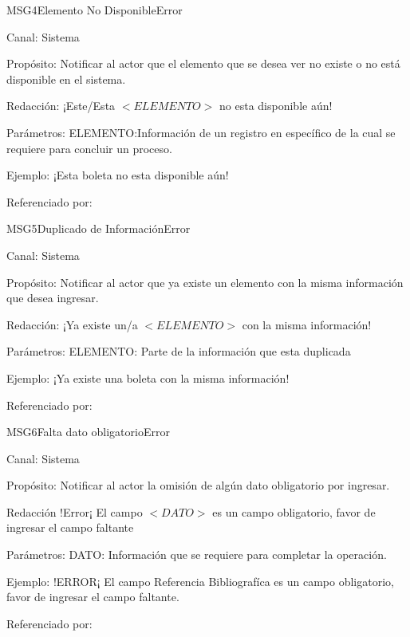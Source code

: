 \begin{mensaje}{MSG4}{Elemento No Disponible}{Error}
	\item[Canal:] Sistema
	\item[Propósito:] Notificar al actor que el elemento que se desea ver no existe o no está disponible en el sistema.
	\item[Redacción:] ¡Este/Esta $<ELEMENTO>$ no esta disponible aún!
	\item[Parámetros:] ELEMENTO:Información de un registro en específico de la cual se requiere para concluir un proceso.
	\item[Ejemplo:] ¡Esta boleta no esta disponible aún!
	\item[Referenciado por: ] 
\end{mensaje}

\begin{mensaje}{MSG5}{Duplicado de Información}{Error}
	\item[Canal:] Sistema
	\item[Propósito:] Notificar al actor que ya existe un elemento con la misma información que desea ingresar.
	\item[Redacción:] ¡Ya existe un/a $<ELEMENTO>$ con la misma información!
	\item[Parámetros:] ELEMENTO: Parte de la información que esta duplicada
	\item[Ejemplo:]¡Ya existe una boleta con la misma información!
	\item[Referenciado por: ] 
\end{mensaje}

\begin{mensaje}{MSG6}{Falta dato obligatorio}{Error}
	\item[Canal:] Sistema
	\item[Propósito:] Notificar al actor la omisión de algún dato obligatorio por ingresar.
	\item[Redacción ] !Error¡ El campo $<DATO>$ es un campo obligatorio, favor de ingresar el campo faltante
	\item[Parámetros:] DATO: Información que se requiere para completar la operación.
	\item[Ejemplo:] !ERROR¡ El campo Referencia Bibliografíca es un campo obligatorio, favor de ingresar el campo faltante.
	\item[Referenciado por: ] 
\end{mensaje}

